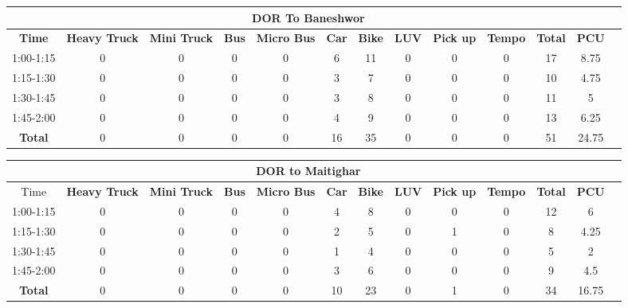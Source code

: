 \begin{landscape}
\centering
\begin{table}[h!]
\centering
\begin{tabular}{|c|c|c|c|c|c|c|c|c|c|c|c|c|}
    \hline
    \multicolumn{12}{|c|}{\textbf{DOR To Baneshwor}} \\
    \hline
    \textbf{Time} & \textbf{Heavy Truck} & \textbf{Mini Truck} & \textbf{Bus} & \textbf{Micro Bus} & \textbf{Car} & \textbf{Bike} & \textbf{LUV} & \textbf{Pick up} & \textbf{Tempo} & \textbf{\textbf{Total}} & \textbf{PCU} \\
    \hline
1:00-1:15	&0	&0	&0	&0	&6	&11	&0	&0	&0	&17	&8.75 \\ \hline
1:15-1:30	&0	&0	&0	&0	&3	&7	&0	&0	&0	&10	&4.75 \\ \hline
1:30-1:45	&0	&0	&0	&0	&3	&8	&0	&0	&0	&11	&5 \\ \hline
1:45-2:00	&0	&0	&0	&0	&4	&9	&0	&0	&0	&13	&6.25 \\ \hline
\textbf{Total}	&0	&0	&0	&0	&16	&35	&0	&0	&0	&51	&24.75 \\ \hline



\end{tabular}

\vspace{0.5cm}

\begin{tabular}{|c|c|c|c|c|c|c|c|c|c|c|c|c|}
    \hline
    \multicolumn{12}{|c|}{\textbf{DOR to Maitighar}} \\
    \hline
        Time & \textbf{Heavy Truck} & \textbf{Mini Truck} & \textbf{Bus} & \textbf{Micro Bus} & \textbf{Car} & \textbf{Bike} & \textbf{LUV} & \textbf{Pick up} & \textbf{Tempo} & \textbf{\textbf{Total}} & \textbf{PCU} \\
    \hline
1:00-1:15	&0	&0	&0	&0	&4	&8	&0	&0	&0	&12	&6 \\ \hline
1:15-1:30	&0	&0	&0	&0	&2	&5	&0	&1	&0	&8	&4.25 \\ \hline
1:30-1:45	&0	&0	&0	&0	&1	&4	&0	&0	&0	&5	&2 \\ \hline
1:45-2:00	&0	&0	&0	&0	&3	&6	&0	&0	&0	&9	&4.5 \\ \hline
\textbf{Total}	&0	&0	&0	&0	&10	&23	&0	&1	&0	&34	&16.75 \\ \hline


\end{tabular}


\end{table}
\end{landscape}
